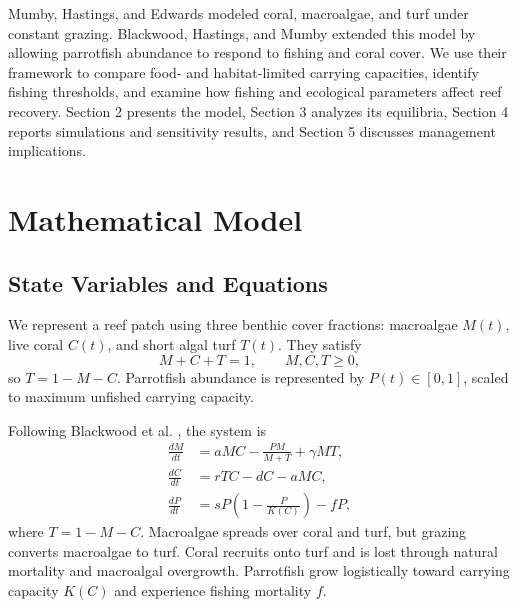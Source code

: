 \documentclass[10pt,a4paper]{article}
\begin{document}
Mumby, Hastings, and Edwards \cite{mumby2007} modeled coral, macroalgae, and turf under constant grazing. Blackwood, Hastings, and Mumby \cite{blackwood2012} extended this model by allowing parrotfish abundance to respond to fishing and coral cover. We use their framework to compare food- and habitat-limited carrying capacities, identify fishing thresholds, and examine how fishing and ecological parameters affect reef recovery. Section 2 presents the model, Section 3 analyzes its equilibria, Section 4 reports simulations and sensitivity results, and Section 5 discusses management implications.

\section{Mathematical Model}

\subsection{State Variables and Equations}

We represent a reef patch using three benthic cover fractions: macroalgae $M(t)$, live coral $C(t)$, and short algal turf $T(t)$. They satisfy
\begin{equation}
    M+C+T=1,\qquad M,C,T\geq 0,
    \label{eq:conservation}
\end{equation}
so $T=1-M-C$. Parrotfish abundance is represented by $P(t)\in[0,1]$, scaled to maximum unfished carrying capacity.

Following Blackwood et al. \cite{blackwood2012}, the system is
\begin{align}
    \frac{dM}{dt} &= aMC-\frac{PM}{M+T}+\gamma MT, \label{eq:dM}\\
    \frac{dC}{dt} &= rTC-dC-aMC, \label{eq:dC}\\
    \frac{dP}{dt} &= sP\left(1-\frac{P}{K(C)}\right)-fP, \label{eq:dP}
\end{align}
where $T=1-M-C$. Macroalgae spreads over coral and turf, but grazing converts macroalgae to turf. Coral recruits onto turf and is lost through natural mortality and macroalgal overgrowth. Parrotfish grow logistically toward carrying capacity $K(C)$ and experience fishing mortality $f$.
\end{document}
